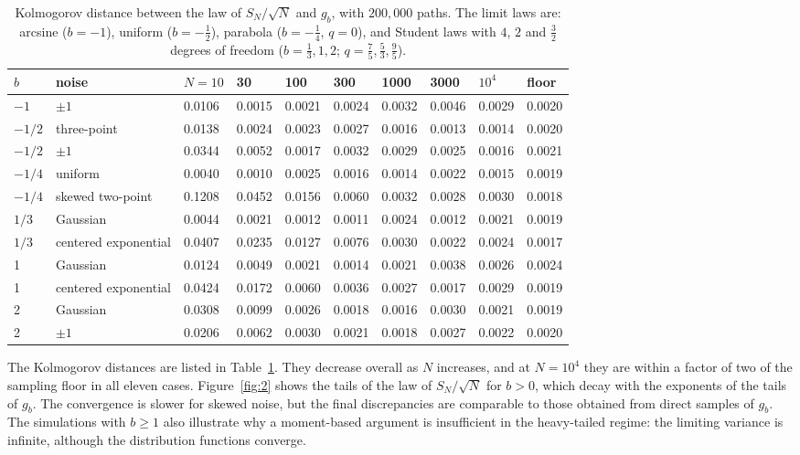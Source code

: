 \documentclass[aip,jmp,preprint,onecolumn,floatfix,superscriptaddress,nofootinbib,11pt]{revtex4-2}
\theoremstyle{plain}
\theoremstyle{remark}
\numberwithin{equation}{section}
\begin{document}
\begin{table}[t]
\caption{Kolmogorov distance between the law of $S_N/\sqrt N$ and $g_b$, with $200{,}000$ paths. The limit laws are: arcsine ($b=-1$), uniform ($b=-\tfrac12$), parabola ($b=-\tfrac14$, $q=0$), and Student laws with $4$, $2$ and $\tfrac32$ degrees of freedom ($b=\tfrac13,1,2$; $q=\tfrac75,\tfrac53,\tfrac95$).}
\label{tab:1}
\centering\small\setlength{\tabcolsep}{4pt}
\begin{tabular}{llllllllll}
\toprule
$b$ & noise & $N=10$ & 30 & 100 & 300 & 1000 & 3000 & $10^{4}$ & floor \\
\midrule
$-1$ & $\pm1$ & 0.0106 & 0.0015 & 0.0021 & 0.0024 & 0.0032 & 0.0046 & 0.0029 & 0.0020 \\
$-1/2$ & three-point & 0.0138 & 0.0024 & 0.0023 & 0.0027 & 0.0016 & 0.0013 & 0.0014 & 0.0020 \\
$-1/2$ & $\pm1$ & 0.0344 & 0.0052 & 0.0017 & 0.0032 & 0.0029 & 0.0025 & 0.0016 & 0.0021 \\
$-1/4$ & uniform & 0.0040 & 0.0010 & 0.0025 & 0.0016 & 0.0014 & 0.0022 & 0.0015 & 0.0019 \\
$-1/4$ & skewed two-point & 0.1208 & 0.0452 & 0.0156 & 0.0060 & 0.0032 & 0.0028 & 0.0030 & 0.0018 \\
$1/3$ & Gaussian & 0.0044 & 0.0021 & 0.0012 & 0.0011 & 0.0024 & 0.0012 & 0.0021 & 0.0019 \\
$1/3$ & centered exponential & 0.0407 & 0.0235 & 0.0127 & 0.0076 & 0.0030 & 0.0022 & 0.0024 & 0.0017 \\
1 & Gaussian & 0.0124 & 0.0049 & 0.0021 & 0.0014 & 0.0021 & 0.0038 & 0.0026 & 0.0024 \\
1 & centered exponential & 0.0424 & 0.0172 & 0.0060 & 0.0036 & 0.0027 & 0.0017 & 0.0029 & 0.0019 \\
2 & Gaussian & 0.0308 & 0.0099 & 0.0026 & 0.0018 & 0.0016 & 0.0030 & 0.0021 & 0.0019 \\
2 & $\pm1$ & 0.0206 & 0.0062 & 0.0030 & 0.0021 & 0.0018 & 0.0027 & 0.0022 & 0.0020 \\
\bottomrule
\end{tabular}
\end{table}

The Kolmogorov distances are listed in Table~\ref{tab:1}. They decrease overall as $N$ increases, and at $N=10^{4}$ they are within a factor of two of the sampling floor in all eleven cases. Figure~\ref{fig:2} shows the tails of the law of $S_N/\sqrt N$ for $b>0$, which decay with the exponents of the tails of $g_b$. The convergence is slower for skewed noise, but the final discrepancies are comparable to those obtained from direct samples of $g_b$. The simulations with $b\ge1$ also illustrate why a moment-based argument is insufficient in the heavy-tailed regime: the limiting variance is infinite, although the distribution functions converge.
\end{document}
